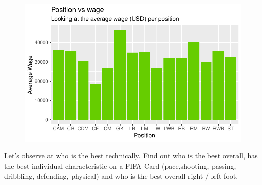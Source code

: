 \documentclass[
  letterpaper,
  DIV=11,
  numbers=noendperiod]{scrartcl}
\begin{document}
\begin{figure}[H]

{\centering \includegraphics{FIFA21_files/figure-pdf/unnamed-chunk-6-1.pdf}

}

\end{figure}

Let's observe at who is the best technically. Find out who is the best
overall, has the best individual characteristic on a FIFA Card
(pace,shooting, passing, dribbling, defending, physical) and who is the
best overall right / left foot.
\end{document}
